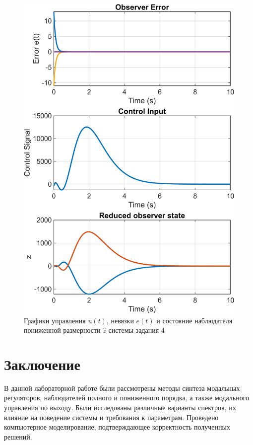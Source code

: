 \begin{figure}[H]
    \centering
    \includegraphics[width=0.7\linewidth]{figs/task4_2.png}
    \caption{Графики управления $u(t)$, невязки $e(t)$ и состояние наблюдателя
    пониженной размерности $\hat z$ системы задания 4}
    \label{fig:4_2}
\end{figure}





\section{Заключение}

В данной лабораторной работе были рассмотрены методы синтеза модальных 
регуляторов, наблюдателей полного и пониженного порядка, а также модального 
управления по выходу. Были исследованы различные варианты спектров, их влияние 
на поведение системы и требования к параметрам. Проведено компьютерное 
моделирование, подтверждающее корректность полученных решений.